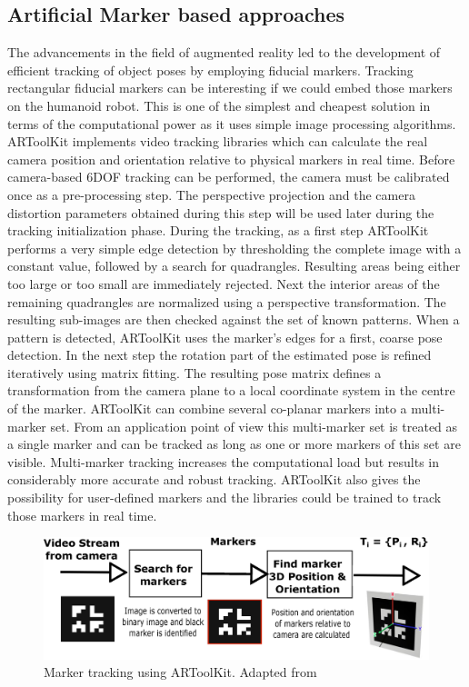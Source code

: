 \subsection{Artificial Marker based approaches}
The advancements in the field of augmented reality led to the development of efficient tracking of object poses by employing fiducial markers. Tracking rectangular fiducial markers can be interesting if we could embed those markers on the humanoid robot. This is one of the simplest and cheapest solution in terms of the computational power as it uses simple image processing algorithms. ARToolKit\cite{kato1999marker} implements video tracking libraries which can calculate the real camera position and orientation relative to physical markers in real time. Before camera-based 6DOF tracking can be performed, the camera must be calibrated once as a pre-processing step. The perspective projection and the camera distortion parameters obtained during this step will be used later during the tracking initialization phase. During the tracking, as a first step ARToolKit performs a very simple edge detection by thresholding the complete image with a constant value, followed by a search for quadrangles. Resulting areas being either too large or too small are immediately rejected. Next the interior areas of the remaining quadrangles are normalized using a perspective transformation. The resulting sub-images are then checked against the set of known patterns. When a pattern is detected, ARToolKit uses the marker’s edges for a first, coarse pose detection. In the next step the rotation part of the estimated pose is refined iteratively using matrix fitting. The resulting pose matrix defines a transformation from the camera plane to a local coordinate system in the centre of the marker. ARToolKit can combine several co-planar markers into a multi-marker set. From an application point of view this multi-marker set is treated as a single marker and can be tracked as long as one or more markers of this set are visible. Multi-marker tracking increases the computational load but results in considerably more accurate and robust tracking. ARToolKit also gives the possibility for user-defined markers and the libraries could be trained to track those markers in real time.
\begin{figure}[H]
\centering
\includegraphics[width=1\textwidth]{assets/artoolkit.eps}
\caption[Marker tracking using ARToolKit]{Marker tracking using ARToolKit. {Adapted from \cite{kato1999marker}}}
\label{fig:artoolkit}
\end{figure}

